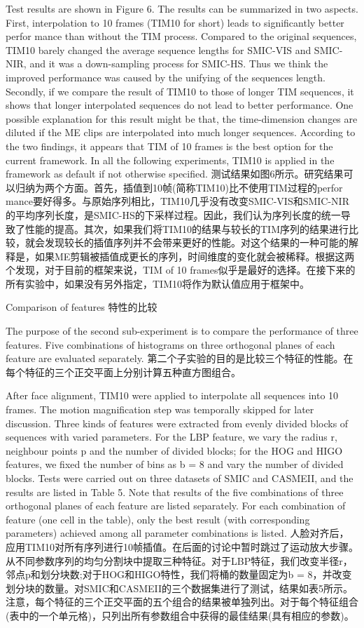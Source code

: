 Test results are shown in Figure 6. The results can be summarized in two aspects. First, interpolation to 10 frames (TIM10 for short) leads to significantly better perfor mance than without the TIM process. Compared to the original sequences, TIM10 barely changed the average sequence lengths for SMIC-VIS and SMIC-NIR, and it was a down-sampling process for SMIC-HS. Thus we think the improved performance was caused by the unifying of the sequences length. Secondly, if we compare the result of TIM10 to those of longer TIM sequences, it shows that longer interpolated sequences do not lead to better performance. One possible explanation for this result might be that, the time-dimension changes are diluted if the ME clips are interpolated into much longer sequences. According to the two findings, it appears that TIM of 10 frames is the best option for the current framework. In all the following experiments, TIM10 is applied in the framework as default if not otherwise specified.
测试结果如图6所示。研究结果可以归纳为两个方面。首先，插值到10帧(简称TIM10)比不使用TIM过程的perfor mance要好得多。与原始序列相比，TIM10几乎没有改变SMIC-VIS和SMIC-NIR的平均序列长度，是SMIC-HS的下采样过程。因此，我们认为序列长度的统一导致了性能的提高。其次，如果我们将TIM10的结果与较长的TIM序列的结果进行比较，就会发现较长的插值序列并不会带来更好的性能。对这个结果的一种可能的解释是，如果ME剪辑被插值成更长的序列，时间维度的变化就会被稀释。根据这两个发现，对于目前的框架来说，TIM of 10 frames似乎是最好的选择。在接下来的所有实验中，如果没有另外指定，TIM10将作为默认值应用于框架中。

Comparison of features
特性的比较

The purpose of the second sub-experiment is to compare the performance of three features. Five combinations of histograms on three orthogonal planes of each feature are evaluated separately.
第二个子实验的目的是比较三个特征的性能。在每个特征的三个正交平面上分别计算五种直方图组合。

After face alignment, TIM10 were applied to interpolate all sequences into 10 frames. The motion magnification step was temporally skipped for later discussion. Three kinds of features were extracted from evenly divided blocks of sequences with varied parameters. For the LBP feature, we vary the radius r, neighbour points p and the number of divided blocks; for the HOG and HIGO features, we fixed the number of bins as b = 8 and vary the number of divided blocks. Tests were carried out on three datasets of SMIC and CASMEII, and the results are listed in Table 5. Note that results of the five combinations of three orthogonal planes of each feature are listed separately. For each combination of feature (one cell in the table), only the best result (with corresponding parameters) achieved among all parameter combinations is listed.
人脸对齐后，应用TIM10对所有序列进行10帧插值。在后面的讨论中暂时跳过了运动放大步骤。从不同参数序列的均匀分割块中提取三种特征。对于LBP特征，我们改变半径r，邻点p和划分块数;对于HOG和HIGO特性，我们将桶的数量固定为b = 8，并改变划分块的数量。对SMIC和CASMEII的三个数据集进行了测试，结果如表5所示。注意，每个特征的三个正交平面的五个组合的结果被单独列出。对于每个特征组合(表中的一个单元格)，只列出所有参数组合中获得的最佳结果(具有相应的参数)。

